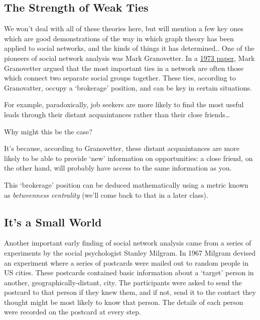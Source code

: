 \documentclass[
]{book}
\begin{document}
\hypertarget{the-strength-of-weak-ties}{%
\subsection{The Strength of Weak Ties}\label{the-strength-of-weak-ties}}

We won't deal with all of these theories here, but will mention a few key ones which are good demonstrations of the way in which graph theory has been applied to social networks, and the kinds of things it has determined.. One of the pioneers of social network analysis was Mark Granovetter. In a \href{https://www.jstor.org/stable/2776392}{1973 paper}, Mark Granovetter argued that the most important ties in a network are often those which connect two separate social groups together. These ties, according to Granovatter, occupy a `brokerage' position, and can be key in certain situations.

For example, paradoxically, job seekers are more likely to find the most useful leads through their distant acquaintances rather than their close friends\ldots{}

Why might this be the case?

It's because, according to Granovetter, these distant acquaintances are more likely to be able to provide `new' information on opportunities: a close friend, on the other hand, will probably have access to the same information as you.

This `brokerage' position can be deduced mathematically using a metric known as \emph{betweenness centrality} (we'll come back to that in a later class).

\hypertarget{its-a-small-world}{%
\subsection{It's a Small World}\label{its-a-small-world}}

Another important early finding of social network analysis came from a series of experiments by the social psychologist Stanley Milgram. In 1967 Milgram devised an experiment where a series of postcards were mailed out to random people in US cities. These postcards contained basic information about a `target' person in another, geographically-distant, city. The participants were asked to send the postcard to that person if they knew them, and if not, send it to the contact they thought might be most likely to know that person. The details of each person were recorded on the postcard at every step.
\end{document}
